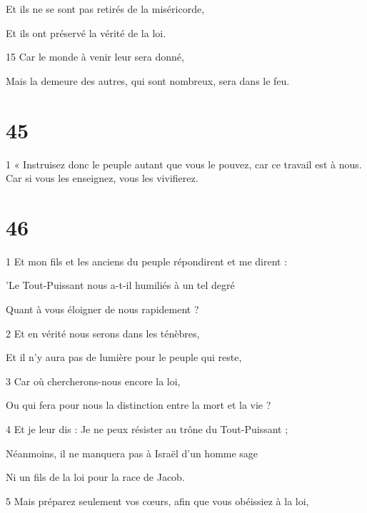 \par Et ils ne se sont pas retirés de la miséricorde,

\par Et ils ont préservé la vérité de la loi.

\par 15 Car le monde à venir leur sera donné,

\par Mais la demeure des autres, qui sont nombreux, sera dans le feu.

\chapter{45}

\par 1 « Instruisez donc le peuple autant que vous le pouvez, car ce travail est à nous. Car si vous les enseignez, vous les vivifierez.

\chapter{46}

\par 1 Et mon fils et les anciens du peuple répondirent et me dirent :

\par 'Le Tout-Puissant nous a-t-il humiliés à un tel degré

\par Quant à vous éloigner de nous rapidement ?

\par 2 Et en vérité nous serons dans les ténèbres,

\par Et il n'y aura pas de lumière pour le peuple qui reste,

\par 3 Car où chercherons-nous encore la loi,

\par Ou qui fera pour nous la distinction entre la mort et la vie ?

\par 4 Et je leur dis : Je ne peux résister au trône du Tout-Puissant ;

\par Néanmoins, il ne manquera pas à Israël d'un homme sage

\par Ni un fils de la loi pour la race de Jacob.

\par 5 Mais préparez seulement vos cœurs, afin que vous obéissiez à la loi,

